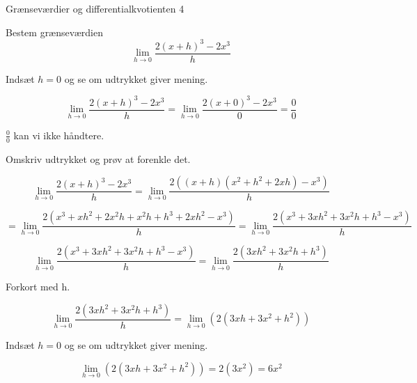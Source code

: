 \documentclass{article}
\begin{document}
\newpage
\begin{exercise}{Grænseværdier og differentialkvotienten 4}
	
	Bestem grænseværdien 
	\[
	\lim_{h \to 0} \frac{2(x+h)^3-2x^3}{h}
	\]
	
	
	\hint
	Indsæt $h=0$ og se om udtrykket giver mening.
	
	\hint
	\[
	\lim_{h \to 0} \frac{2(x+h)^3-2x^3}{h} = \lim_{h \to 0} \frac{2(x+0)^3-2x^3}{0} = \frac{0}{0}
	\]
	
	\hint
	$\frac{0}{0}$ kan vi ikke håndtere.
	
	\hint
	Omskriv udtrykket og prøv at forenkle det.
	
	\hint
	\[
	\lim_{h \to 0} \frac{2(x+h)^3-2x^3}{h} = \lim_{h \to 0} \frac{2\left((x+h)(x^2+h^2+2xh)-x^3\right)}{h} 
	\]
	
	\hint
	\[
	= \lim_{h \to 0} \frac{2\left(x^3+xh^2+2x^2h+x^2h+h^3+2xh^2-x^3\right)}{h}  = \lim_{h \to 0} \frac{2\left(x^3+3xh^2+3x^2h+h^3-x^3\right)}{h}
	\]
	
	
	\hint
	\[
	\lim_{h \to 0} \frac{2\left(x^3+3xh^2+3x^2h+h^3-x^3\right)}{h} =  \lim_{h \to 0} \frac{2\left(3xh^2+3x^2h+h^3\right)}{h}
	\]
	
	\hint
	Forkort med h.
	
	\hint
	\[
	\lim_{h \to 0} \frac{2\left(3xh^2+3x^2h+h^3\right)}{h} = \lim_{h \to 0} \left(2\left(3xh+3x^2+h^2\right)\right)
	\]
	
	\hint
	Indsæt $h=0$ og se om udtrykket giver mening.
	
	\hint
	\[
	\lim_{h \to 0} \left(2\left(3xh+3x^2+h^2\right)\right) = 2(3x^2) = 6x^2
	\]
	
\end{exercise}
\end{document}
